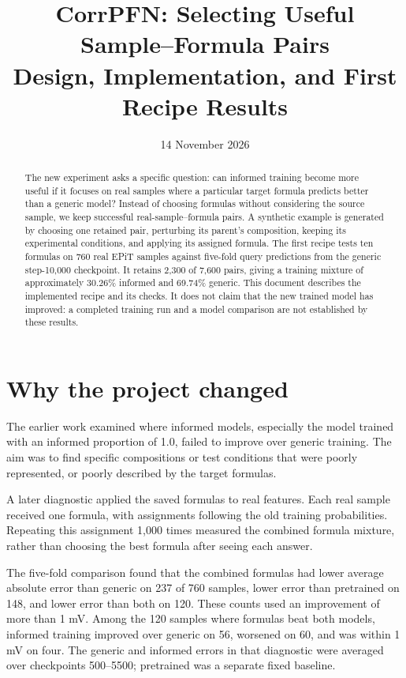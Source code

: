 \documentclass[11pt]{article}
\title{CorrPFN: Selecting Useful Sample--Formula Pairs\\
\large Design, Implementation, and First Recipe Results}
\author{}
\date{14 November 2026}
\begin{document}
\maketitle

\begin{abstract}
The new experiment asks a specific question: can informed training become more
useful if it focuses on real samples where a particular target formula predicts
better than a generic model? Instead of choosing formulas without considering
the source sample, we keep successful real-sample--formula pairs. A synthetic
example is generated by choosing one retained pair, perturbing its parent's
composition, keeping its experimental conditions, and applying its assigned
formula. The first recipe tests ten formulas on 760 real EPiT samples against
five-fold query predictions from the generic step-10,000 checkpoint. It retains
2,300 of 7,600 pairs, giving a training mixture of approximately 30.26\% informed
and 69.74\% generic. This document describes the implemented recipe and its
checks. It does not claim that the new trained model has improved: a completed
training run and a model comparison are not established by these results.
\end{abstract}

\tableofcontents
\newpage

\section{Why the project changed}
The earlier work examined where informed models, especially the model trained
with an informed proportion of 1.0, failed to improve over generic training.
The aim was to find specific compositions or test conditions that were poorly
represented, or poorly described by the target formulas.

A later diagnostic applied the saved formulas to real features. Each real
sample received one formula, with assignments following the old training
probabilities. Repeating this assignment 1,000 times measured the combined
formula mixture, rather than choosing the best formula after seeing each answer.

The five-fold comparison found that the combined formulas had lower average
absolute error than generic on 237 of 760 samples, lower error than pretrained
on 148, and lower error than both on 120. These counts used an improvement of
more than 1 mV. Among the 120 samples where formulas beat both models, informed
training improved over generic on 56, worsened on 60, and was within 1 mV on four.
The generic and informed errors in that diagnostic were averaged over
checkpoints 500--5500; pretrained was a separate fixed baseline.
\end{document}
